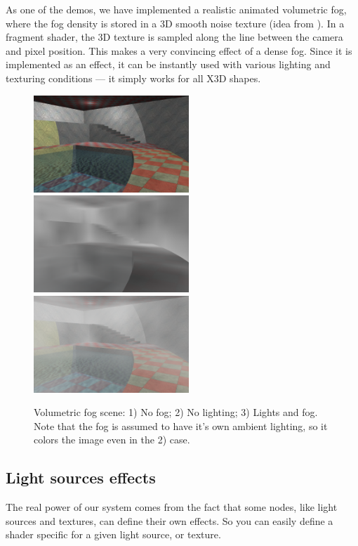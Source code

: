 \documentclass{acmsiggraph}                     %
\begin{document}
As one of the demos, we have implemented a realistic
animated volumetric fog, where the fog density is stored in
a 3D smooth noise texture (idea from \cite{humus:volumetricfog}).
In a fragment shader, the 3D texture is sampled
along the line between the camera and pixel position. This makes a very
convincing effect of a dense fog. Since it is implemented as an effect,
it can be instantly used with various lighting and texturing conditions
--- it simply works for all X3D shapes.

\begin{figure}[t]
  \centering
  \includegraphics[width=2.3in]{volumetric_animated_fog_no_fog}
  \includegraphics[width=2.3in]{volumetric_animated_fog_no_light}
  \includegraphics[width=2.3in]{volumetric_animated_fog_all}
  \caption{Volumetric fog scene: 1) No fog; 2) No lighting; 3) Lights and fog.
Note that the fog is assumed to have it's own ambient lighting,
so it colors the image even in the 2) case.}
\end{figure}

\subsection{Light sources effects}

The real power of our system comes from the fact that some nodes,
like light sources and textures, can define their own effects.
So you can easily define a shader specific for a given light source,
or texture.
\end{document}
